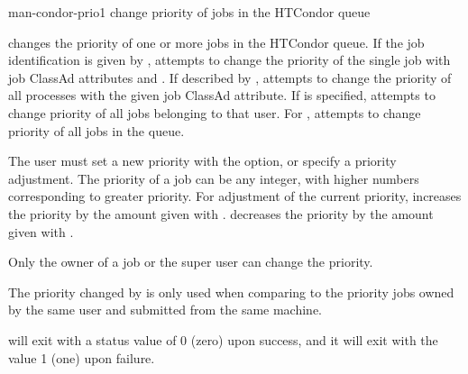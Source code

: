 \begin{ManPage}{}{man-condor-prio}{1}
{change priority of jobs in the HTCondor queue} 

\Synopsis {}
 \Bar{}  \Bar{} 

 \Bar{}  \Bar{} 
\Lbr {}   \Rbr
{}

\Description

 changes the priority of one or more jobs in the HTCondor queue.
If the job identification is given by ,
 attempts to change the priority of the single job
with job ClassAd attributes  and .
If described by ,
 attempts to change the priority of all processes with the
given  job ClassAd attribute.
If  is specified,  attempts to change priority
of all jobs belonging to that user.
For ,  attempts to change priority of
all jobs in the queue.

The user must set a new priority with the  option,
or specify a priority adjustment. 
The priority of a job can be any integer, with higher numbers
corresponding to greater priority.
For adjustment of the current priority,
 increases the priority by the amount given with .
 decreases the priority by the amount given with .

Only the owner of a job or the super user can change the priority.

The priority changed by  is only used when
comparing to the priority
jobs owned by the same user and submitted from the same machine.

\begin{Options}
\end{Options}

\ExitStatus

 will exit with a status value of 0 (zero) upon success,
and it will exit with the value 1 (one) upon failure.

\end{ManPage}
